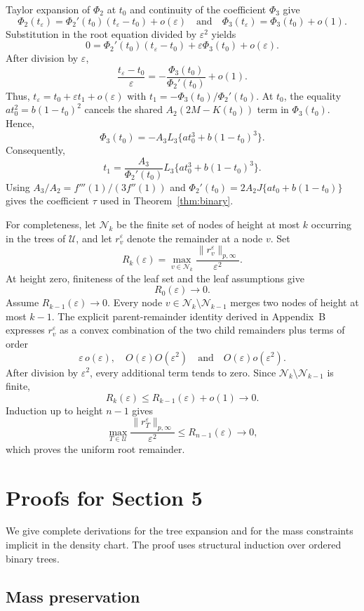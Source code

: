 \documentclass[11pt]{article}
\theoremstyle{plain}
\theoremstyle{definition}
\theoremstyle{definition}
\newcommand{\eps}{\varepsilon}
\begin{document}
Taylor expansion of $\Phi_2$ at $t_0$ and continuity of the coefficient $\Phi_3$ give
\[
\Phi_2(t_\eps)=\Phi_2'(t_0)(t_\eps-t_0)+o(\eps)
\quad\text{and}\quad
\Phi_3(t_\eps)=\Phi_3(t_0)+o(1).
\]
Substitution in the root equation divided by $\eps^2$ yields
\[
0=\Phi_2'(t_0)(t_\eps-t_0)+\eps\Phi_3(t_0)+o(\eps).
\]
After division by $\eps$,
\[
\frac{t_\eps-t_0}{\eps}=-\frac{\Phi_3(t_0)}{\Phi_2'(t_0)}+o(1).
\]
Thus, $t_\eps=t_0+\eps t_1+o(\eps)$ with $t_1=-\Phi_3(t_0)/\Phi_2'(t_0)$.
At $t_0$, the equality $at_0^2=b(1-t_0)^2$ cancels the shared $A_2(2M-K(t_0))$ term in $\Phi_3(t_0)$. Hence,
\[
\Phi_3(t_0)=-A_3L_3\{at_0^3+b(1-t_0)^3\}.
\]
Consequently,
\[
t_1=\frac{A_3}{\Phi_2'(t_0)}L_3\{at_0^3+b(1-t_0)^3\}.
\]
Using $A_3/A_2=f'''(1)/(3f''(1))$ and $\Phi_2'(t_0)=2A_2J\{at_0+b(1-t_0)\}$ gives the coefficient $\tau$ used in Theorem~\ref{thm:binary}.


For completeness, let $\mathcal N_k$ be the finite set of nodes of height at most $k$ occurring in the trees of $\mathcal U$, and let $r_v^\eps$ denote the remainder at a node $v$. Set
\[
R_k(\eps)=\max_{v\in\mathcal N_k}
\frac{\|r_v^\eps\|_{p,\infty}}{\eps^2}.
\]
At height zero, finiteness of the leaf set and the leaf assumptions give
\[
R_0(\eps)\longrightarrow0.
\]
Assume $R_{k-1}(\eps)\to0$. Every node $v\in\mathcal N_k\setminus\mathcal N_{k-1}$ merges two nodes of height at most $k-1$. The explicit parent-remainder identity derived in Appendix~B expresses $r_v^\eps$ as a convex combination of the two child remainders plus terms of order
\[
\eps\,o(\eps),
\quad
O(\eps)O(\eps^2)
\quad\text{and}\quad
O(\eps)o(\eps^2).
\]
After division by $\eps^2$, every additional term tends to zero. Since $\mathcal N_k\setminus\mathcal N_{k-1}$ is finite,
\[
R_k(\eps)
\le R_{k-1}(\eps)+o(1)
\longrightarrow0.
\]
Induction up to height $n-1$ gives
\[
\max_{T\in\mathcal U}
\frac{\|r_T^\eps\|_{p,\infty}}{\eps^2}
\le R_{n-1}(\eps)\longrightarrow0,
\]
which proves the uniform root remainder.


\section{Proofs for Section 5}

We give complete derivations for the tree expansion and for the mass constraints implicit in the density chart. The proof uses structural induction over ordered binary trees.

\subsection{Mass preservation}
\end{document}
